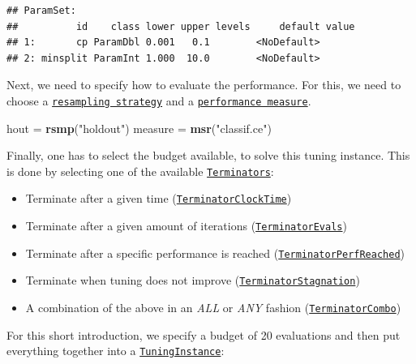 \documentclass[]{scrbook}
\newenvironment{Shaded}{\begin{snugshade}}{\end{snugshade}}
\newcommand{\KeywordTok}[1]{\textcolor[rgb]{0.13,0.29,0.53}{\textbf{#1}}}
\newcommand{\NormalTok}[1]{#1}
\newcommand{\StringTok}[1]{\textcolor[rgb]{0.31,0.60,0.02}{#1}}
\providecommand{\tightlist}{%
  \setlength{\itemsep}{0pt}\setlength{\parskip}{0pt}}
\renewenvironment{Shaded} {\begin{snugshade}\small} {\end{snugshade}}
\begin{document}
\begin{verbatim}
## ParamSet: 
##          id    class lower upper levels     default value
## 1:       cp ParamDbl 0.001   0.1        <NoDefault>      
## 2: minsplit ParamInt 1.000  10.0        <NoDefault>
\end{verbatim}

Next, we need to specify how to evaluate the performance.
For this, we need to choose a \href{https://mlr3.mlr-org.com/reference/Resampling.html}{\texttt{resampling\ strategy}} and a \href{https://mlr3.mlr-org.com/reference/Measure.html}{\texttt{performance\ measure}}.

\begin{Shaded}
\begin{Highlighting}[]
\NormalTok{hout =}\StringTok{ }\KeywordTok{rsmp}\NormalTok{(}\StringTok{"holdout"}\NormalTok{)}
\NormalTok{measure =}\StringTok{ }\KeywordTok{msr}\NormalTok{(}\StringTok{"classif.ce"}\NormalTok{)}
\end{Highlighting}
\end{Shaded}

Finally, one has to select the budget available, to solve this tuning instance.
This is done by selecting one of the available \href{https://mlr3tuning.mlr-org.com/reference/Terminator.html}{\texttt{Terminators}}:

\begin{itemize}
\tightlist
\item
  Terminate after a given time (\href{https://mlr3tuning.mlr-org.com/reference/mlr_terminators_clock_time.html}{\texttt{TerminatorClockTime}})
\item
  Terminate after a given amount of iterations (\href{https://mlr3tuning.mlr-org.com/reference/mlr_terminators_evals.html}{\texttt{TerminatorEvals}})
\item
  Terminate after a specific performance is reached (\href{https://mlr3tuning.mlr-org.com/reference/mlr_terminators_perf_reached.html}{\texttt{TerminatorPerfReached}})
\item
  Terminate when tuning does not improve (\href{https://mlr3tuning.mlr-org.com/reference/mlr_terminators_stagnation.html}{\texttt{TerminatorStagnation}})
\item
  A combination of the above in an \emph{ALL} or \emph{ANY} fashion (\href{https://mlr3tuning.mlr-org.com/reference/mlr_terminators_combo.html}{\texttt{TerminatorCombo}})
\end{itemize}

For this short introduction, we specify a budget of 20 evaluations and then put everything together into a \href{https://mlr3tuning.mlr-org.com/reference/TuningInstance.html}{\texttt{TuningInstance}}:
\end{document}
